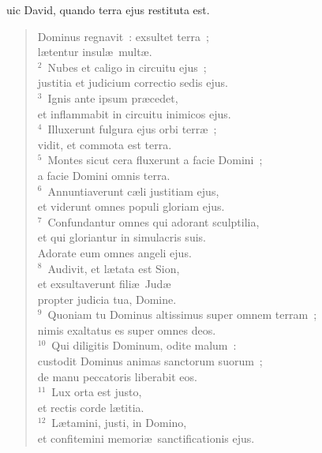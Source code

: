 \bchapter[Psalm]
uic David, quando terra ejus restituta est. \begin{verse}Dominus regnavit~: exsultet terra~;\\ l\ae tentur insul\ae\ mult\ae .\\
${}^{2}$~Nubes et caligo in circuitu ejus~;\\ justitia et judicium correctio sedis ejus.\\
${}^{3}$~Ignis ante ipsum pr\ae cedet,\\ et inflammabit in circuitu inimicos ejus.\\
${}^{4}$~Illuxerunt fulgura ejus orbi terr\ae~;\\ vidit, et commota est terra.\\
${}^{5}$~Montes sicut cera fluxerunt a facie Domini~;\\ a facie Domini omnis terra.\\
${}^{6}$~Annuntiaverunt c\ae li justitiam ejus,\\ et viderunt omnes populi gloriam ejus.\\
${}^{7}$~Confundantur omnes qui adorant sculptilia,\\ et qui gloriantur in simulacris suis.\\ Adorate eum omnes angeli ejus.\\
${}^{8}$~Audivit, et l\ae tata est Sion,\\ et exsultaverunt fili\ae\ Jud\ae \\ propter judicia tua, Domine.\\
${}^{9}$~Quoniam tu Dominus altissimus super omnem terram~;\\ nimis exaltatus es super omnes deos.\\
${}^{10}$~Qui diligitis Dominum, odite malum~:\\ custodit Dominus animas sanctorum suorum~;\\ de manu peccatoris liberabit eos.\\
${}^{11}$~Lux orta est justo,\\ et rectis corde l\ae titia.\\
${}^{12}$~L\ae tamini, justi, in Domino,\\ et confitemini memori\ae\ sanctificationis ejus.\end{verse}



